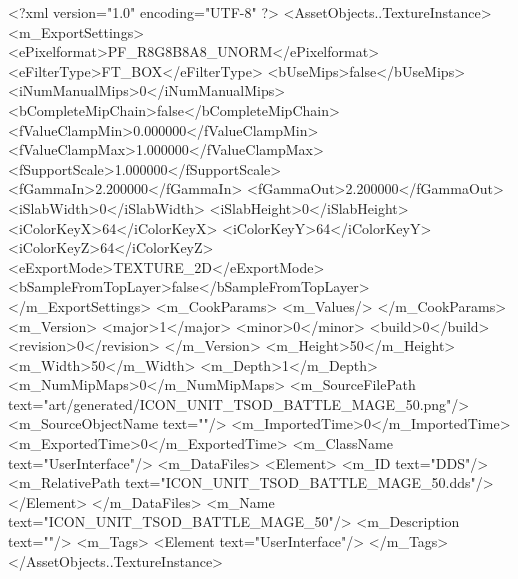 <?xml version="1.0" encoding="UTF-8" ?>
<AssetObjects..TextureInstance>
	<m_ExportSettings>
		<ePixelformat>PF_R8G8B8A8_UNORM</ePixelformat>
		<eFilterType>FT_BOX</eFilterType>
		<bUseMips>false</bUseMips>
		<iNumManualMips>0</iNumManualMips>
		<bCompleteMipChain>false</bCompleteMipChain>
		<fValueClampMin>0.000000</fValueClampMin>
		<fValueClampMax>1.000000</fValueClampMax>
		<fSupportScale>1.000000</fSupportScale>
		<fGammaIn>2.200000</fGammaIn>
		<fGammaOut>2.200000</fGammaOut>
		<iSlabWidth>0</iSlabWidth>
		<iSlabHeight>0</iSlabHeight>
		<iColorKeyX>64</iColorKeyX>
		<iColorKeyY>64</iColorKeyY>
		<iColorKeyZ>64</iColorKeyZ>
		<eExportMode>TEXTURE_2D</eExportMode>
		<bSampleFromTopLayer>false</bSampleFromTopLayer>
	</m_ExportSettings>
	<m_CookParams>
		<m_Values/>
	</m_CookParams>
	<m_Version>
		<major>1</major>
		<minor>0</minor>
		<build>0</build>
		<revision>0</revision>
	</m_Version>
	<m_Height>50</m_Height>
	<m_Width>50</m_Width>
	<m_Depth>1</m_Depth>
	<m_NumMipMaps>0</m_NumMipMaps>
	<m_SourceFilePath text="art/generated/ICON_UNIT_TSOD_BATTLE_MAGE_50.png"/>
	<m_SourceObjectName text=""/>
	<m_ImportedTime>0</m_ImportedTime>
	<m_ExportedTime>0</m_ExportedTime>
	<m_ClassName text="UserInterface"/>
	<m_DataFiles>
		<Element>
			<m_ID text="DDS"/>
			<m_RelativePath text="ICON_UNIT_TSOD_BATTLE_MAGE_50.dds"/>
		</Element>
	</m_DataFiles>
	<m_Name text="ICON_UNIT_TSOD_BATTLE_MAGE_50"/>
	<m_Description text=""/>
	<m_Tags>
		<Element text="UserInterface"/>
	</m_Tags>
</AssetObjects..TextureInstance>
